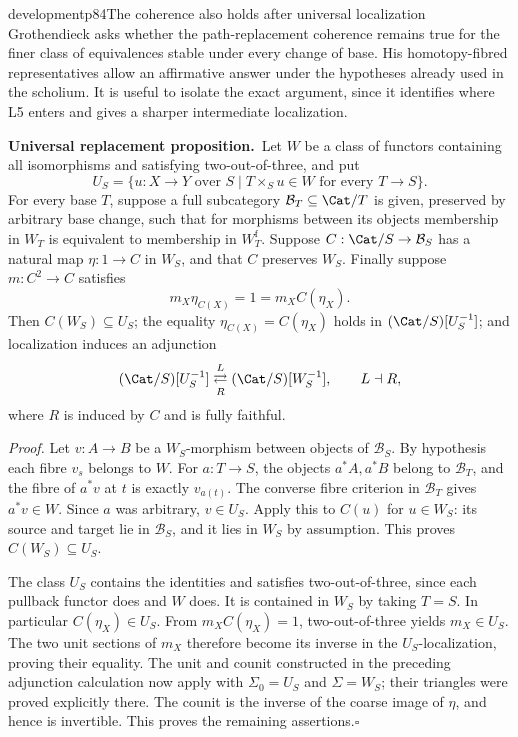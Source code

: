 \begin{dcomment}{development}{p84}{The coherence also holds after universal localization}
Grothendieck asks whether the path-replacement coherence remains true for the finer class of equivalences stable under every change of base. His homotopy-fibred representatives allow an affirmative answer under the hypotheses already used in the scholium. It is useful to isolate the exact argument, since it identifies where L5 enters and gives a sharper intermediate localization.

\textbf{Universal replacement proposition.}\ours\ Let $W$ be a class of functors containing all isomorphisms and satisfying two-out-of-three, and put
\[
 U_S=\{u:X\to Y\text{ over }S\mid
 T\times_Su\in W\text{ for every }T\to S\}.
\]
For every base $T$, suppose a full subcategory $\mathcal B_T\subseteq\Cat/T$ is given, preserved by arbitrary base change, such that for morphisms between its objects membership in $W_T$ is equivalent to membership in $W_T^{\mathrm f}$. Suppose $C:\Cat/S\to\mathcal B_S$ has a natural map $\eta:1\to C$ in $W_S$, and that $C$ preserves $W_S$. Finally suppose $m:C^2\to C$ satisfies
\[
 m_X\eta_{C(X)}=1=m_XC(\eta_X).
\]
Then $C(W_S)\subseteq U_S$; the equality $\eta_{C(X)}=C(\eta_X)$ holds in $(\Cat/S)[U_S^{-1}]$; and localization induces an adjunction
\[
 (\Cat/S)[U_S^{-1}]
 \mathrel{\mathop{\rightleftarrows}^{L}_{R}}
 (\Cat/S)[W_S^{-1}],\qquad L\dashv R,
\]
where $R$ is induced by $C$ and is fully faithful.

\emph{Proof.} Let $v:A\to B$ be a $W_S$-morphism between objects of $\mathcal B_S$. By hypothesis each fibre $v_s$ belongs to $W$. For $a:T\to S$, the objects $a^*A,a^*B$ belong to $\mathcal B_T$, and the fibre of $a^*v$ at $t$ is exactly $v_{a(t)}$. The converse fibre criterion in $\mathcal B_T$ gives $a^*v\in W$. Since $a$ was arbitrary, $v\in U_S$. Apply this to $C(u)$ for $u\in W_S$: its source and target lie in $\mathcal B_S$, and it lies in $W_S$ by assumption. This proves $C(W_S)\subseteq U_S$.

The class $U_S$ contains the identities and satisfies two-out-of-three, since each pullback functor does and $W$ does. It is contained in $W_S$ by taking $T=S$. In particular $C(\eta_X)\in U_S$. From $m_XC(\eta_X)=1$, two-out-of-three yields $m_X\in U_S$. The two unit sections of $m_X$ therefore become its inverse in the $U_S$-localization, proving their equality. The unit and counit constructed in the preceding adjunction calculation now apply with $\Sigma_0=U_S$ and $\Sigma=W_S$; their triangles were proved explicitly there. The counit is the inverse of the coarse image of $\eta$, and hence is invertible. This proves the remaining assertions.\hfill$\square$


\end{dcomment}
